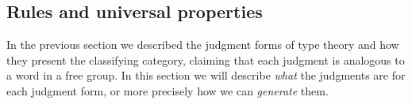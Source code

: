 \documentclass[12pt]{article}
\def\m#1{\llbracket#1\rrbracket}
\def\refl{\mathsf{refl}}
\def\types{\vdash}
\def\Ctx{\mathbf{Ctx}}
\numberwithin{equation}{section}
\begin{document}





\subsection{Rules and universal properties}
\label{sec:rules}

In the previous section we described the judgment forms of type theory and how they present the classifying category, claiming that each judgment %
is analogous to a word in a free group.
In this section we will describe \emph{what} the judgments are for each judgment form, or more precisely how we can \emph{generate} them.
\end{document}
